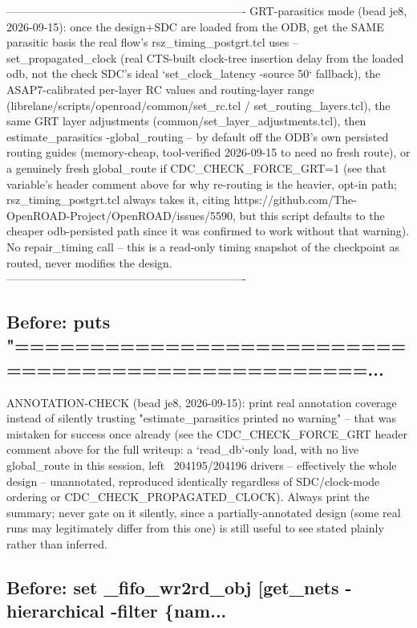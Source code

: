 \begin{record}
\begin{textblock}
----------------------------------------------------------------
GRT-parasitics mode (bead je8, 2026-09-15): once the design+SDC are
loaded from the ODB, get the SAME parasitic basis the real flow's
rsz_timing_postgrt.tcl uses -- set_propagated_clock (real CTS-built
clock-tree insertion delay from the loaded odb, not the check SDC's
ideal `set_clock_latency -source 50` fallback), the ASAP7-calibrated
per-layer RC values and routing-layer range
(librelane/scripts/openroad/common/set_rc.tcl /
set_routing_layers.tcl), the same GRT layer adjustments
(common/set_layer_adjustments.tcl), then estimate_parasitics
-global_routing -- by default off the ODB's own persisted routing
guides (memory-cheap, tool-verified 2026-09-15 to need no fresh route),
or a genuinely fresh global_route if CDC_CHECK_FORCE_GRT=1 (see that
variable's header comment above for why re-routing is the heavier,
opt-in path; rsz_timing_postgrt.tcl always takes it, citing
https://github.com/The-OpenROAD-Project/OpenROAD/issues/5590, but this
script defaults to the cheaper odb-persisted path since it was
confirmed to work without that warning). No repair_timing call -- this
is a read-only timing snapshot of the checkpoint as routed, never
modifies the design.
----------------------------------------------------------------
\end{textblock}

\subsection*{Before: puts "==================================================...}

\begin{textblock}
ANNOTATION-CHECK (bead je8, 2026-09-15): print real annotation
coverage instead of silently trusting "estimate_parasitics printed
no warning" -- that was mistaken for success once already (see the
CDC_CHECK_FORCE_GRT header comment above for the full writeup: a
`read_db`-only load, with no live global_route in this session,
left ~204195/204196 drivers -- effectively the whole design --
unannotated, reproduced identically regardless of SDC/clock-mode
ordering or CDC_CHECK_PROPAGATED_CLOCK). Always print the summary;
never gate on it silently, since a partially-annotated design (some
real runs may legitimately differ from this one) is still useful
to see stated plainly rather than inferred.
\end{textblock}

\subsection*{Before: set \_fifo\_wr2rd\_obj [get\_nets -hierarchical -filter \{nam...}


\end{record}
